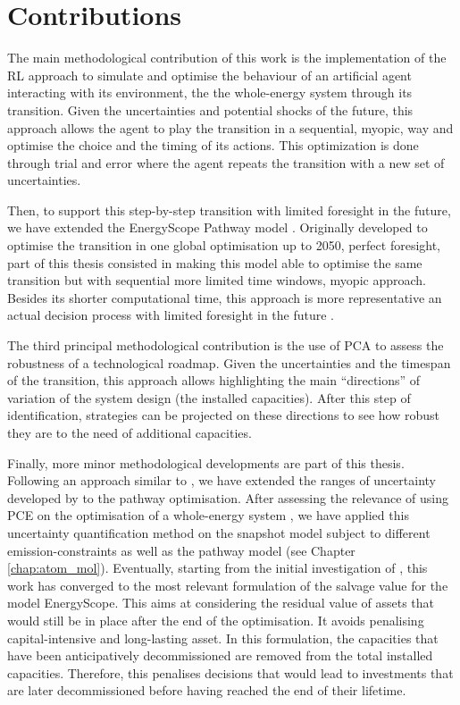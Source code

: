 \section*{Contributions}
\label{sec:meth:contributions}
The main methodological contribution of this work is the implementation of the \gls{RL} approach to simulate and optimise the behaviour of an artificial agent interacting with its environment, \ie the the whole-energy system through its transition. Given the uncertainties and potential shocks of the future, this approach allows the agent to play the transition in a sequential, \ie myopic, way and optimise the choice and the timing of its actions. This optimization is done through trial and error where the agent repeats the transition with a new set of uncertainties. 

Then, to support this step-by-step transition with limited foresight in the future, we have extended the EnergyScope Pathway model \cite{limpens2021generating}. Originally developed to optimise the transition in one global optimisation up to 2050, \ie perfect foresight, part of this thesis consisted in making this model able to optimise the same transition but with sequential more limited time windows, \ie myopic approach. Besides its shorter computational time, this approach is more representative an actual decision process with limited foresight in the future \cite{babrowski2014reducing}.

The third principal methodological contribution is the use of \acrfull{PCA} to assess the robustness of a technological roadmap. Given the uncertainties and the timespan of the transition, this approach allows highlighting the main ``directions'' of variation of the system design (\ie the installed capacities). After this step of identification, strategies can be projected on these directions to see how robust they are to the need of additional capacities.

Finally, more minor methodological developments are part of this thesis. Following an approach similar to \citet{guevara2022modeling}, we have extended the ranges of uncertainty developed by \citet{Moret2017} to the pathway optimisation. After assessing the relevance of using \acrfull{PCE} on the optimisation of a whole-energy system \cite{limpens2020impact}, we have applied this uncertainty quantification method on the snapshot model subject to different emission-constraints \cite{rixhon2021role} as well as the pathway model (see Chapter \ref{chap:atom_mol}). Eventually, starting from the initial investigation of \citet{goffauxpathway}, this work has converged to the most relevant formulation of the salvage value for the model EnergyScope. This aims at considering the residual value of assets that would still be in place after the end of the optimisation. It avoids penalising capital-intensive and long-lasting asset. In this formulation, the capacities that have been anticipatively decommissioned are removed from the total installed capacities. Therefore, this penalises decisions that would lead to investments that are later decommissioned before having reached the end of their lifetime.

